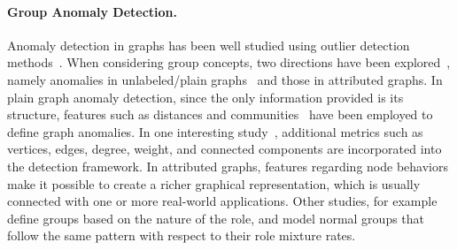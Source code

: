 \paragraph{Group Anomaly Detection.}
Anomaly detection in graphs has been well studied using outlier detection methods~\cite{akoglu2009anomaly}. When considering group concepts, two directions have been explored~\cite{akoglu2015graph}, namely anomalies in unlabeled/plain graphs~\cite{noble2003graph} and those in
attributed graphs. In plain graph anomaly detection, since the only information provided is its structure, features such as distances and communities~\cite{sun2005neighborhood} have been employed to define graph anomalies. In one interesting study~\cite{henderson2010metric}, additional metrics such as vertices, edges, degree, weight, and connected components are incorporated into the detection framework. In attributed graphs, features regarding node behaviors make it possible to create a richer graphical representation, which is usually connected with one or more real-world applications. Other studies, for example~\cite{yu2014glad} define groups based on the nature of the role, and model normal groups that follow the same pattern with respect to their role mixture rates. %

